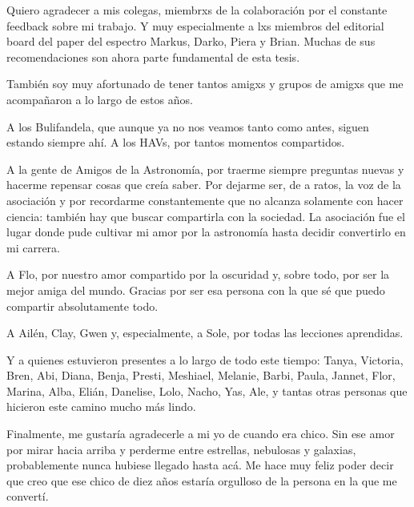 Quiero agradecer a mis colegas, miembrxs de la colaboración por el constante feedback sobre mi trabajo. Y muy especialmente a lxs miembros del editorial board del paper del espectro Markus, Darko, Piera y Brian. Muchas de sus recomendaciones son ahora parte fundamental de esta tesis.

También soy muy afortunado de tener tantos amigxs y grupos de amigxs que me acompañaron a lo largo de estos años.

A los Bulifandela, que aunque ya no nos veamos tanto como antes, siguen estando siempre ahí. A los HAVs, por tantos momentos compartidos.

A la gente de Amigos de la Astronomía, por traerme siempre preguntas nuevas y hacerme repensar cosas que creía saber. Por dejarme ser, de a ratos, la voz de la asociación y por recordarme constantemente que no alcanza solamente con hacer ciencia: también hay que buscar compartirla con la sociedad. La asociación fue el lugar donde pude cultivar mi amor por la astronomía hasta decidir convertirlo en mi carrera.

A Flo, por nuestro amor compartido por la oscuridad y, sobre todo, por ser la mejor amiga del mundo. Gracias por ser esa persona con la que sé que puedo compartir absolutamente todo.

A Ailén, Clay, Gwen y, especialmente, a Sole, por todas las lecciones aprendidas.

Y a quienes estuvieron presentes a lo largo de todo este tiempo: Tanya, Victoria, Bren, Abi, Diana, Benja, Presti, Meshiael, Melanie, Barbi, Paula, Jannet, Flor, Marina, Alba, Elián, Danelise, Lolo, Nacho, Yas, Ale, y tantas otras personas que hicieron este camino mucho más lindo.

Finalmente, me gustaría agradecerle a mi yo de cuando era chico. Sin ese amor por mirar hacia arriba y perderme entre estrellas, nebulosas y galaxias, probablemente nunca hubiese llegado hasta acá. Me hace muy feliz poder decir que creo que ese chico de diez años estaría orgulloso de la persona en la que me convertí.
